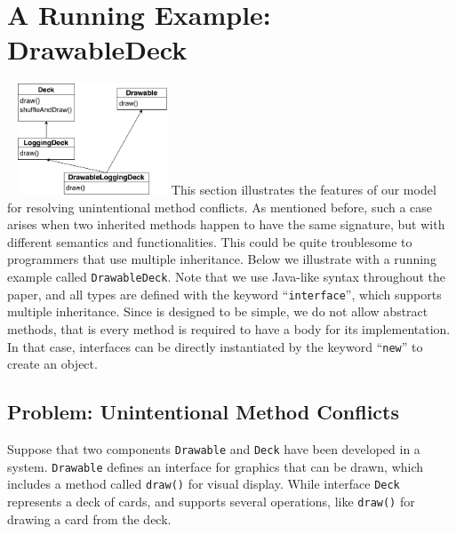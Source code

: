 \section{A Running Example: DrawableDeck}~\label{sec:overview}
\includegraphics[height=3.3cm]{pics/DrawableLoggingDeck.pdf}
This section illustrates the features of our \MIM{} model for resolving unintentional method
conflicts. As mentioned before, such a case arises when two inherited methods happen to have the
same signature, but with different semantics and functionalities. This could be quite troublesome
to programmers that use multiple inheritance. Below we illustrate with a running example called \lstinline|DrawableDeck|.
Note that we use Java-like syntax throughout the paper, and all types are defined with the keyword ``\lstinline|interface|'', which
supports multiple inheritance. Since \MIM{} is designed to be simple, we do not allow abstract methods, that is every method
is required to have a body for its implementation. In that case, interfaces can be directly instantiated by the keyword ``\lstinline|new|''
to create an object.

\subsection{Problem: Unintentional Method Conflicts}

Suppose that two components \lstinline|Drawable| and \lstinline|Deck| have been developed in a system.
\lstinline|Drawable| defines an interface for graphics that can be drawn, which includes a method called \lstinline|draw()|
for visual display. While interface \lstinline|Deck| represents a deck of cards, and supports several operations, like
\lstinline|draw()| for drawing a card from the deck.

